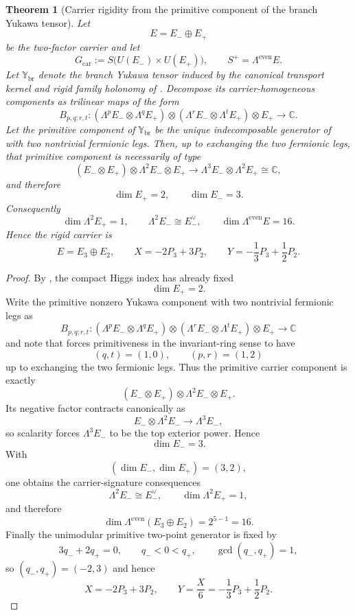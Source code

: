 \documentclass[11pt,a4paper]{article}
\newtheorem{theorem}{Theorem}[section]
\theoremstyle{definition}
\theoremstyle{remark}
\begin{document}
\begin{theorem}[Carrier rigidity from the primitive component of the branch Yukawa tensor]
\label{thm:yukawa-forces-32}
Let
\[
E=E_-\oplus E_+
\]
be the two-factor carrier and let
\[
G_{\mathrm{car}}:=S\bigl(U(E_-)\times U(E_+)\bigr),
\qquad
S^+=\Lambda^{\mathrm{even}}E.
\]
Let $\mathbb Y_{\mathrm{br}}$ denote the branch Yukawa tensor induced by the canonical transport
kernel and rigid family holonomy of
. Decompose its carrier-homogeneous
components as trilinear maps of the form
\[
B_{p,q;r,t}:
(\Lambda^p E_-\otimes \Lambda^q E_+)
\otimes
(\Lambda^r E_-\otimes \Lambda^t E_+)
\otimes E_+
\longrightarrow
\mathbb C.
\]
Let the primitive component of $\mathbb Y_{\mathrm{br}}$ be the unique indecomposable generator of
 with two nontrivial
fermionic legs. Then, up to exchanging the two fermionic legs, that primitive component is
necessarily of type
\[
(E_-\otimes E_+) \otimes \Lambda^2 E_- \otimes E_+
\longrightarrow
\Lambda^3 E_-\otimes \Lambda^2 E_+\cong\mathbb C,
\]
and therefore
\[
\dim E_+=2,
\qquad
\dim E_-=3.
\]
Consequently
\[
\dim \Lambda^2 E_+=1,
\qquad
\Lambda^2 E_- \cong E_-^\vee,
\qquad
\dim \Lambda^{\mathrm{even}}E=16.
\]
Hence the rigid carrier is
\[
E=E_3\oplus E_2,
\qquad
X=-2P_3+3P_2,
\qquad
Y=-\frac13 P_3+\frac12 P_2.
\]
\end{theorem}

\begin{proof}
By , the compact Higgs index has already fixed
\[
\dim E_+=2.
\]
Write the primitive nonzero Yukawa component with two nontrivial fermionic legs as
\[
B_{p,q;r,t}:
(\Lambda^p E_-\otimes \Lambda^q E_+)
\otimes
(\Lambda^r E_-\otimes \Lambda^t E_+)
\otimes E_+
\longrightarrow
\mathbb C
\]
and note that  forces primitiveness in the invariant-ring
sense to have
\[
(q,t)=(1,0),
\qquad
(p,r)=(1,2)
\]
up to exchanging the two fermionic legs. Thus the primitive carrier component is exactly
\[
(E_-\otimes E_+) \otimes \Lambda^2 E_- \otimes E_+.
\]
Its negative factor contracts canonically as
\[
E_- \otimes \Lambda^2 E_- \longrightarrow \Lambda^3 E_-,
\]
so scalarity forces $\Lambda^3 E_-$ to be the top exterior power. Hence
\[
\dim E_-=3.
\]
With
\[
(\dim E_-,\dim E_+)=(3,2),
\]
one obtains the carrier-signature consequences
\[
\Lambda^2 E_- \cong E_-^\vee,
\qquad
\dim\Lambda^2 E_+=1,
\]
and therefore
\[
\dim \Lambda^{\mathrm{even}}(E_3\oplus E_2)=2^{5-1}=16.
\]
Finally the unimodular primitive two-point generator is fixed by
\[
3q_-+2q_+=0,
\qquad
q_-<0<q_+,
\qquad
\gcd(q_-,q_+)=1,
\]
so $(q_-,q_+) = (-2,3)$ and hence
\[
X=-2P_3+3P_2,
\qquad
Y=\frac{X}{6}=-\frac13 P_3+\frac12 P_2.
\]
\end{proof}
\end{document}

